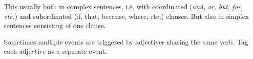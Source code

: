 This usually both in complex sentences, i.e. with coordinated (\textit{and, or, but, for, etc.}) and subordinated (if, that, because, where, etc.) clauses.
But also in simplex sentences consisting of one clause.

\begin{exe}
    \ex {}
    \ex {}
\end{exe}

Sometimes multiple events are triggered by adjectives sharing the same verb. Tag each adjective as a separate event.




    

    
